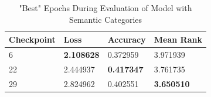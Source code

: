 \begin{table}[ht!]
\centering
\caption{"Best" Epochs During Evaluation of Model with Semantic Categories}
\begin{tabular}{l | l | l | l}
Checkpoint & Loss & Accuracy & Mean Rank \\
\hline
6 & \textbf{2.108628} & 0.372959 & 3.971939 \\
22 & 2.444937 & \textbf{0.417347} & 3.761735 \\
29 & 2.824962 & 0.402551 & \textbf{3.650510} 
\end{tabular}
\label{tab:best_category}
\end{table}


